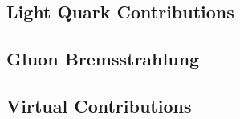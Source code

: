 \subsection{Light Quark Contributions}


\subsection{Gluon Bremsstrahlung}


\subsection{Virtual Contributions}

